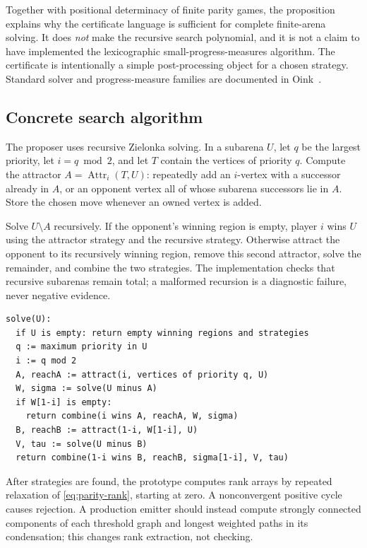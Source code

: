 Together with positional determinacy of finite parity games, the proposition
explains why the certificate language is sufficient for complete finite-arena
solving. It does \emph{not} make the recursive search polynomial, and it is not
a claim to have implemented the lexicographic small-progress-measures algorithm.
The certificate is intentionally a simple post-processing object for a chosen
strategy. Standard solver and progress-measure families are documented in
Oink~\cite{oink}.

\subsection{Concrete search algorithm}

The proposer uses recursive Zielonka solving. In a subarena $U$, let $q$ be the
largest priority, let $i=q\bmod2$, and let $T$ contain the vertices of priority
$q$. Compute the attractor $A=\operatorname{Attr}_i(T,U)$: repeatedly add an
$i$-vertex with a successor already in $A$, or an opponent vertex all of whose
subarena successors lie in $A$. Store the chosen move whenever an owned vertex
is added.

Solve $U\setminus A$ recursively. If the opponent's winning region is empty,
player $i$ wins $U$ using the attractor strategy and the recursive strategy.
Otherwise attract the opponent to its recursively winning region, remove this
second attractor, solve the remainder, and combine the two strategies.
The implementation checks that recursive subarenas remain total; a malformed
recursion is a diagnostic failure, never negative evidence.

\begin{lstlisting}
solve(U):
  if U is empty: return empty winning regions and strategies
  q := maximum priority in U
  i := q mod 2
  A, reachA := attract(i, vertices of priority q, U)
  W, sigma := solve(U minus A)
  if W[1-i] is empty:
    return combine(i wins A, reachA, W, sigma)
  B, reachB := attract(1-i, W[1-i], U)
  V, tau := solve(U minus B)
  return combine(1-i wins B, reachB, sigma[1-i], V, tau)
\end{lstlisting}

After strategies are found, the prototype computes rank arrays by repeated
relaxation of \eqref{eq:parity-rank}, starting at zero. A nonconvergent positive
cycle causes rejection. A production emitter should instead compute strongly
connected components of each threshold graph and longest weighted paths in
its condensation; this changes rank extraction, not checking.

